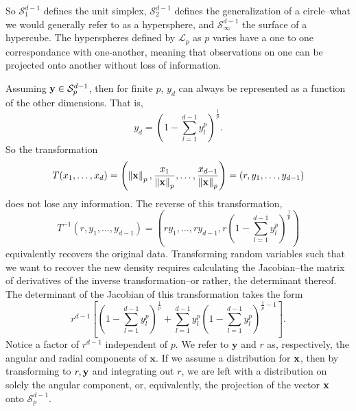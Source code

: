 So $\mathcal{S}_{1}^{d-1}$ defines the unit simplex, $\mathcal{S}_{2}^{d-1}$ defines the generalization
  of a circle--what we would generally refer to as a hypersphere, and $\mathcal{S}_{\infty}^{d-1}$
  the surface of a hypercube. The hyperspheres defined by $\mathcal{L}_p$ as $p$ varies have a one
  to one correspondance with one-another, meaning that observations on one can be projected onto
  another without loss of information.

Assuming ${\bf y} \in \mathcal{S}_{p}^{d-1}$, then for finite $p$, $y_d$ can always be represented
  as a function of the other dimensions.  That is,
  \begin{equation*}
    y_d = \left(1 - \sum_{l = 1}^{d-1}y_l^p\right)^{\frac{1}{p}}.
  \end{equation*}
  So the transformation
  \begin{equation*}
    T(x_1,\ldots,x_d) = \left(\left\lVert {\bf x} \right\rVert_{p}, \frac{x_1}{\left\lVert {\bf x} \right\rVert_{p}},
                          \ldots , \frac{x_{d-1}}{\left\lVert {\bf x} \right\rVert_{p}}\right) = (r,y_1,\ldots,y_{d-1})
  \end{equation*}
  does not lose any information.  The reverse of this transformation,
  \begin{equation*}
    T^{-1}\left(r,y_1,\ldots,y_{d-1}\right) =
      \left(ry_1,\ldots,ry_{d-1}, r\left(1 - {\scriptstyle\sum}_{l = 1}^{d-1}y_l^p\right)^{\frac{1}{p}}\right)
  \end{equation*}
  equivalently recovers the original data.  Transforming random variables such that we want to recover
  the new density requires calculating the Jacobian--the matrix of derivatives of the inverse
  transformation--or rather, the determinant thereof.  The determinant of the Jacobian of this
  transformation takes the form
  \begin{equation*}
    r^{d-1}\left[\left(1 - \sum_{l = 1}^{d-1}y_l^p\right)^{\frac{1}{p}} +
        \sum_{l = 1}^{d-1}y_l^p\left(1 - \sum_{l=1}^{d-1} y_l^p\right)^{\frac{1}{p} - 1}\right].
  \end{equation*}
  Notice a factor of $r^{d-1}$ independent of $p$. We refer to $\bm{y}$ and $r$ as, respectively,
  the angular and radial components of $\bm{x}$.  If we assume a distribution for ${\bf x}$, then
  by transforming to $r, {\bf y}$ and integrating out $r$, we are left with a distribution on solely
  the angular component, or, equivalently, the projection of the vector ${\bf x}$ onto
  $\mathcal{S}_{p}^{d-1}$.

